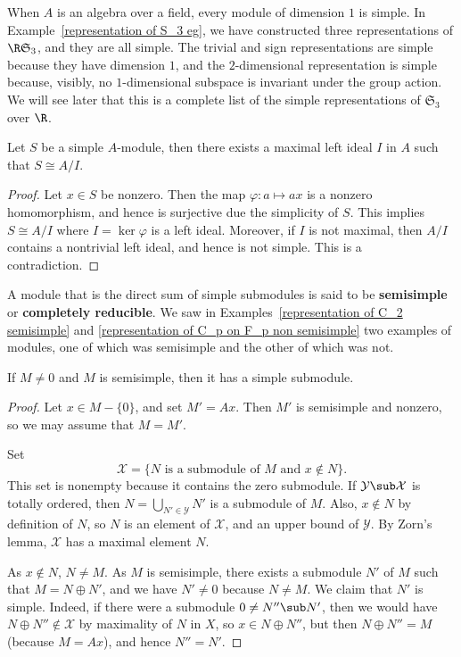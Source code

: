 \begin{example}
When $A$ is an algebra over a field, every module of dimension $1$ is simple. In Example~\ref{representation of S_3 eg}, we have constructed three representations of $\R\mathfrak{S}_3$, and they are all simple. The trivial and sign representations are simple because they have dimension $1$, and the $2$-dimensional representation is simple because, visibly, no $1$-dimensional subspace is invariant under the group action. We will see later that this is a complete list of the simple representations of $\mathfrak{S}_3$ over $\R$.
\end{example}
\begin{proposition}\label{simple module is cyclic}
Let $S$ be a simple $A$-module, then there exists a maximal left ideal $I$ in $A$ such that $S\cong A/I$.
\end{proposition}
\begin{proof}
Let $x\in S$ be nonzero. Then the map $\varphi:a\mapsto ax$ is a nonzero homomorphism, and hence is surjective due the simplicity of $S$. This implies $S\cong A/I$ where $I=\ker\varphi$ is a left ideal. Moreover, if $I$ is not maximal, then $A/I$ contains a nontrivial left ideal, and hence is not simple. This is a contradiction.
\end{proof}
A module that is the direct sum of simple submodules is said to be \textbf{semisimple} or \textbf{completely reducible}. We saw in Examples~\ref{representation of C_2 semisimple} and \ref{representation of C_p on F_p non semisimple} two examples of modules, one of which was semisimple and the other of which was not.
\begin{lemma}\label{semisimple simple submodule}
If $M\neq 0$ and $M$ is semisimple, then it has a simple submodule.
\end{lemma}
\begin{proof}
Let $x\in M-\{0\}$, and set $M'=Ax$. Then $M'$ is semisimple and nonzero, so we may assume that $M=M'$.\par
Set
\[\mathcal{X}=\{\text{$N$ is a submodule of $M$ and $x\notin N$}\}.\]
This set is nonempty because it contains the zero submodule. If $\mathcal{Y}\sub \mathcal{X}$ is totally ordered, then $N=\bigcup_{N'\in \mathcal{Y}}N'$ is a submodule of $M$. Also, $x\notin N$ by definition of $N$, so $N$ is an element of $\mathcal{X}$, and an upper bound of $\mathcal{Y}$. By Zorn's lemma, $\mathcal{X}$ has a maximal element $N$.\par
As $x\notin N$, $N\neq M$. As $M$ is semisimple, there exists a submodule $N'$ of $M$ such that $M=N\oplus N'$, and we have $N'\neq 0$ because $N\neq M$. We claim that $N'$ is simple. Indeed, if there were a submodule $0\neq N''\sub N'$, then we would have $N\oplus N''\notin\mathcal{X}$ by maximality of $N$ in $X$, so $x\in N\oplus N''$, but then $N\oplus N''=M$ (because $M=Ax$), and hence $N''=N'$.
\end{proof}
